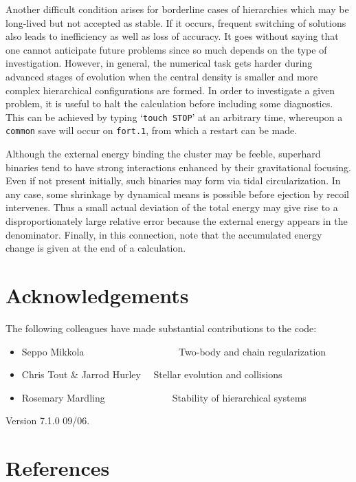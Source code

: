 \documentclass[12pt]{article}
\begin{document}
Another difficult condition arises for borderline cases of hierarchies which
may be long-lived but not accepted as stable.
If it occurs, frequent switching of solutions also leads to inefficiency as
well as loss of accuracy.
It goes without saying that one cannot anticipate future problems since so
much depends on the type of investigation.
However, in general, the numerical task gets harder during advanced stages of
evolution when the central density is smaller and more complex hierarchical
configurations are formed.
In order to investigate a given problem, it is useful to halt the
calculation before including some diagnostics.
This can be achieved by typing `{\tt touch STOP}' at an arbitrary time,
whereupon a {\tt common} save will occur on {\tt fort.1}, from which a
restart can be made.

Although the external energy binding the cluster may be feeble, superhard
binaries tend to have strong interactions enhanced by their gravitational
focusing.
Even if not present initially, such binaries may form via tidal
circularization.
In any case, some shrinkage by dynamical means is possible before ejection
by recoil intervenes.
Thus a small actual deviation of the total energy may give rise to a
disproportionately large relative error because the external energy appears
in the denominator.
Finally, in this connection, note that the accumulated energy change is
given at the end of a calculation.

\section{Acknowledgements}

The following colleagues have made substantial contributions to the code:

\begin{itemize}

\item Seppo Mikkola ~~~~~~~~~~~~~~~~~~~Two-body and chain regularization
\item Chris Tout \& Jarrod Hurley ~~Stellar evolution and collisions
\item Rosemary Mardling~~~~~~~~~~~~~~Stability of hierarchical systems
\end{itemize}

\bigskip
Version 7.1.0 09/06.

\newpage
\section*{References}
\end{document}
